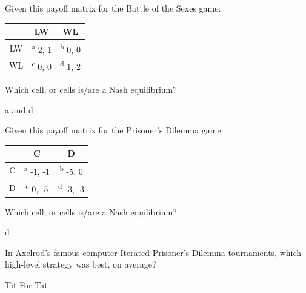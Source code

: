 \begin{questions}

\question Given this payoff matrix for the Battle of the Sexes game:

\begin{center}
\begin{tabular}{|c|c|c|}\hline
   & LW     & WL         \\\hline
LW & \textsuperscript{a} 2, 1  & \textsuperscript{b} 0, 0 \\\hline
WL & \textsuperscript{c} 0, 0  & \textsuperscript{d} 1, 2 \\\hline
\end{tabular}
\end{center}

Which cell, or cells is/are a Nash equilibrium?

\begin{solution}[.5in]
a and d
\end{solution}

\question Given this payoff matrix for the Prisoner's Dilemma game:

\begin{center}
\begin{tabular}{|c|c|c|}\hline
  & C      & D         \\\hline
C & \textsuperscript{a} -1, -1 & \textsuperscript{b} -5, 0 \\\hline
D & \textsuperscript{c} 0, -5  & \textsuperscript{d} -3, -3 \\\hline
\end{tabular}
\end{center}

Which cell, or cells is/are a Nash equilibrium?

\begin{solution}[.5in]
d
\end{solution}

\question In Axelrod's famous computer Iterated Prisoner's Dilemma tournaments, which high-level strategy was best, on average?

\begin{solution}[.5in]
Tit For Tat
\end{solution}

\end{questions}


